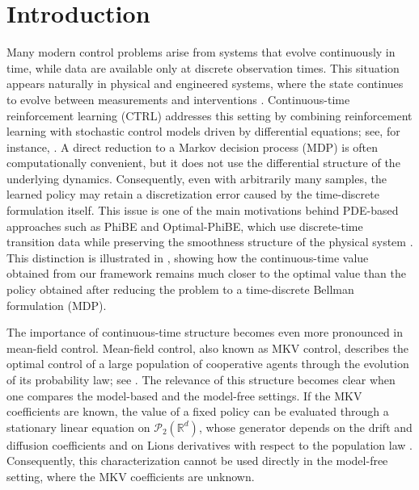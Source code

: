 \documentclass[a4paper, 10pt, english, reqno]{amsart}
\begin{document}
\section{Introduction}
Many modern control problems arise from systems that evolve continuously in time, while data are available only at discrete observation times. This situation appears naturally in physical and engineered systems, where the state continues to evolve between measurements and interventions \cite{lin1998optimal,song2023reaching,pham2009continuous}. Continuous-time reinforcement learning (CTRL) addresses this setting by combining reinforcement learning with stochastic control models driven by differential equations; see, for instance, \cite{wang2020,jia2022,jia2023,jia_qlearning2023}. A direct reduction to a Markov decision process (MDP) is often computationally convenient, but it does not use the differential structure of the underlying dynamics. Consequently, even with arbitrarily many samples, the learned policy may retain a discretization error caused by the time-discrete formulation itself. This issue is one of the main motivations behind PDE-based approaches such as PhiBE and Optimal-PhiBE, which use discrete-time transition data while preserving the smoothness structure of the physical system \cite{zhu2024phibe,zhu2025optimalphibe}. This distinction is illustrated in , showing how the continuous-time value obtained from our framework remains much closer to the optimal value than the policy obtained after reducing the problem to a time-discrete Bellman formulation (MDP). 

The importance of continuous-time structure becomes even more pronounced in mean-field control. Mean-field control, also known as MKV control, describes the optimal control of a large population of cooperative agents through the evolution of its probability law; see \cite{carmona2018probabilistic1,carmona2018probabilistic2,benbook,Lacker}. The relevance of this structure becomes clear when one compares the model-based and the model-free settings. If the MKV coefficients are known, the value of a fixed policy can be evaluated through a stationary linear equation on $\mathcal P_2(\mathbb R^d)$, whose generator depends on the drift and diffusion coefficients and on Lions derivatives with respect to the population law \cite{CarmDel15,PhamWei}. Consequently, this characterization cannot be used directly in the model-free setting, where the MKV coefficients are unknown.
\end{document}
